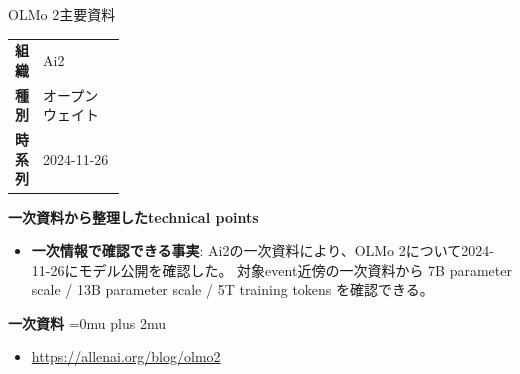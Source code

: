 \begin{technicalnote}{OLMo 2}{主要資料}
\begingroup
\begin{tabularx}{\linewidth}{@{}>{\bfseries}p{0.22\linewidth}X@{}}
組織 & Ai2 \\
種別 & オープンウェイト \\
時系列 & 2024-11-26 \\
\end{tabularx}
\smallskip
{\bfseries 一次資料から整理したtechnical points}
\begin{itemize}[leftmargin=1.5em,itemsep=0.35em]
\item \textbf{一次情報で確認できる事実}: Ai2の一次資料により、OLMo 2について2024-11-26にモデル公開を確認した。 対象event近傍の一次資料から 7B parameter scale / 13B parameter scale / 5T training tokens を確認できる。
\end{itemize}
\begin{minipage}{\linewidth}
\begin{samepage}
{\bfseries 一次資料}
\begingroup\sloppy
\Urlmuskip=0mu plus 2mu\relax
\begin{itemize}[leftmargin=1.5em,itemsep=0.25em]
\item {\scriptsize\url{https://allenai.org/blog/olmo2}}
\end{itemize}
\endgroup
\end{samepage}
\end{minipage}
\endgroup
\end{technicalnote}
\medskip

